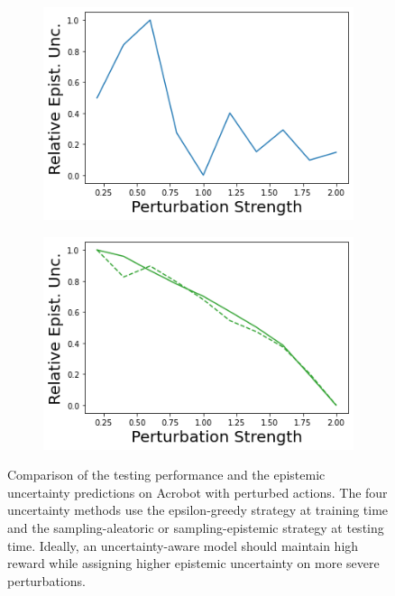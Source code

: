 \begin{figure}
\begin{subfigure}{.245\textwidth}
        \includegraphics[width=\textwidth]{sections/011_icml2022/resources/action_shift-DKL-AcrobotShift-v0-mean_epistemic_uncertainty_.png}
    \end{subfigure}
    \begin{subfigure}{.245\textwidth}
        \includegraphics[width=\textwidth]{sections/011_icml2022/resources/action_shift-PostNet-AcrobotShift-v0-mean_epistemic_uncertainty_.png}
    \end{subfigure}
    \caption{Comparison of the testing performance and the epistemic uncertainty predictions on Acrobot with perturbed actions. The four uncertainty methods use the epsilon-greedy strategy at training time and the sampling-aleatoric or sampling-epistemic strategy at testing time. Ideally, an uncertainty-aware model should maintain high reward while assigning higher epistemic uncertainty on more severe perturbations.}
    \label{fig:strategy-action-shift-testing-performance-acrobot}
\end{figure}